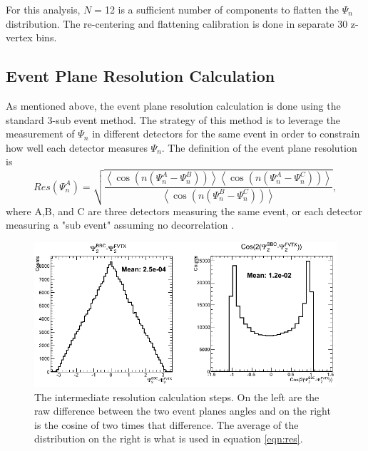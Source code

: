 For this analysis, $N=$12 is a sufficient number of components to flatten the $\Psi_n$ distribution. The re-centering and flattening calibration is done in separate 30 z-vertex bins.

\subsection{Event Plane Resolution Calculation}
As mentioned above, the event plane resolution calculation is done using the standard 3-sub event method. The strategy of this method is to leverage the measurement of $\Psi_n$ in
different detectors for the same event in order to constrain how well each detector measures $\Psi_n$. The definition of the event plane resolution is
\begin{equation}
Res(\Psi_n^A) = \sqrt{\frac{\left<\cos(n(\Psi_n^A - \Psi_n^B))\right>\left<\cos(n(\Psi_n^A - \Psi_n^C))\right>}{\left<\cos(n(\Psi_n^B - \Psi_n^C))\right>}},
\label{eqn:res}
\end{equation}
where A,B, and C are three detectors measuring the same event, or each detector measuring a "sub event" assuming no decorrelation \cite{PhysRevC.58.1671}.

\begin{figure}[!h]
\begin{center}
\includegraphics[width=0.85\linewidth]{figs/resolution_intermediate_calc.png}
\caption{The intermediate resolution calculation steps. On the left are the raw difference between the two event planes angles and on the right is the cosine of two times that difference. The average of the distribution on the right is what is used in equation \ref{eqn:res}.}
\label{fig:fvtx_ew_default}
\end{center}
\end{figure}

